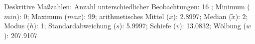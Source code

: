 				\label{tableValues:prsa043a}
				\vspace*{-\baselineskip}
                    \begin{noten}
                	    \note{} Deskritive Maßzahlen:
                	    Anzahl unterschiedlicher Beobachtungen: 16%
                	    ; 
                	      Minimum ($min$): 0; 
                	      Maximum ($max$): 99; 
                	      arithmetisches Mittel ($\bar{x}$): \num[round-mode=places,round-precision=2]{2,8997}; 
                	      Median ($\tilde{x}$): 2; 
                	      Modus ($h$): 1; 
                	      Standardabweichung ($s$): \num[round-mode=places,round-precision=2]{5,9997}; 
                	      Schiefe ($v$): \num[round-mode=places,round-precision=2]{13,0832}; 
                	      Wölbung ($w$): \num[round-mode=places,round-precision=2]{207,9107}
                     \end{noten}


